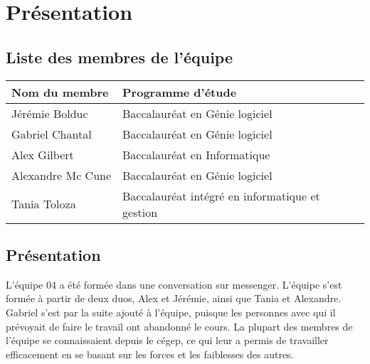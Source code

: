 \chapter{Présentation}
\label{s:presentation}

\section{Liste des membres de l'équipe}

\begin{tabular}{|l|l|}
	\hline
	Nom du membre & Programme d'étude\\\hline
	Jérémie Bolduc & Baccalauréat en Génie logiciel\\\hline
	Gabriel Chantal & Baccalauréat en Génie logiciel\\\hline
	Alex Gilbert & Baccalauréat en Informatique\\\hline
	Alexandre Mc Cune & Baccalauréat en Génie logiciel\\\hline
	Tania Toloza & Baccalauréat intégré en informatique et gestion\\\hline
\end{tabular}

\section{Présentation}

L'équipe 04 a été formée dans une conversation sur messenger. L'équipe s'est formée à partir de deux duos, Alex et Jérémie, ainsi que Tania et Alexandre. Gabriel s'est par la suite ajouté à l'équipe, puisque les personnes avec qui il prévoyait de faire le travail ont abandonné le cours. La plupart des membres de l'équipe se connaissaient depuis le cégep, ce qui leur a permis de travailler efficacement en se basant sur les forces et les faiblesses des autres.